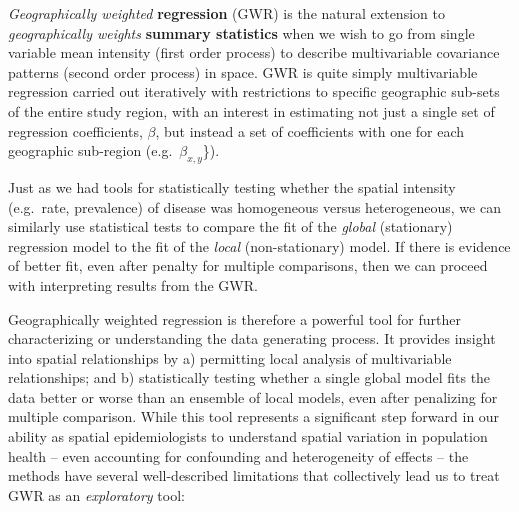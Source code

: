 \documentclass[
]{book}
\begin{document}
\emph{Geographically weighted} \textbf{regression} (GWR) is the natural extension to \emph{geographically weights} \textbf{summary statistics} when we wish to go from single variable mean intensity (first order process) to describe multivariable covariance patterns (second order process) in space. GWR is quite simply multivariable regression carried out iteratively with restrictions to specific geographic sub-sets of the entire study region, with an interest in estimating not just a single set of regression coefficients, \(\beta\), but instead a set of coefficients with one for each geographic sub-region (e.g.~\(\beta_{x,y}\)\}).

Just as we had tools for statistically testing whether the spatial intensity (e.g.~rate, prevalence) of disease was homogeneous versus heterogeneous, we can similarly use statistical tests to compare the fit of the \emph{global} (stationary) regression model to the fit of the \emph{local} (non-stationary) model. If there is evidence of better fit, even after penalty for multiple comparisons, then we can proceed with interpreting results from the GWR.

Geographically weighted regression is therefore a powerful tool for further characterizing or understanding the data generating process. It provides insight into spatial relationships by a) permitting local analysis of multivariable relationships; and b) statistically testing whether a single global model fits the data better or worse than an ensemble of local models, even after penalizing for multiple comparison. While this tool represents a significant step forward in our ability as spatial epidemiologists to understand spatial variation in population health -- even accounting for confounding and heterogeneity of effects -- the methods have several well-described limitations that collectively lead us to treat GWR as an \emph{exploratory} tool:
\end{document}
